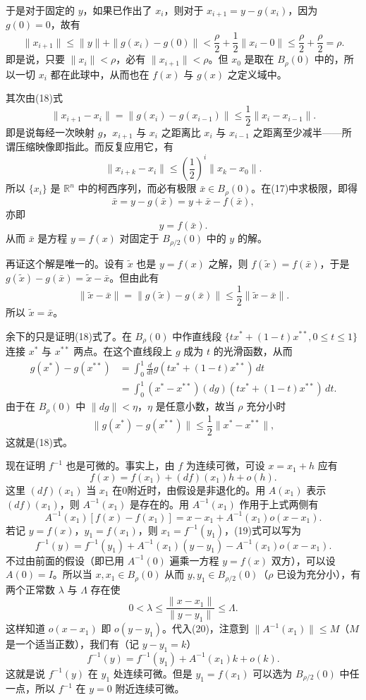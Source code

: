 于是对于固定的 $y$，如果已作出了 $x_i$，则对于 $x_{i+1}=y-g(x_i)$，因为 $g(0)=0$，故有
\[
 \|x_{i+1}\|\le\|y\|+\|g(x_i)-g(0)\|<\frac\rho2+\frac12\|x_i-0\|
 \le\frac\rho2+\frac\rho2=\rho.
\]
即是说，只要 $\|x_i\|<\rho$，必有 $\|x_{i+1}\|<\rho$。但 $x_0$ 是取在 $B_\rho(0)$ 中的，所以一切 $x_i$ 都在此球中，从而也在 $f(x)$ 与 $g(x)$ 之定义域中。

其次由(18)式
\[
 \|x_{i+1}-x_i\|=\|g(x_i)-g(x_{i-1})\|\le\frac12\|x_i-x_{i-1}\|.
\]
即是说每经一次映射 $g$，$x_{i+1}$ 与 $x_i$ 之距离比 $x_i$ 与 $x_{i-1}$ 之距离至少减半——所谓压缩映像即指此。而反复应用它，有
\[
 \|x_{i+k}-x_i\|\le\left(\frac12\right)^i\|x_k-x_0\|.
\]
所以 $\{x_i\}$ 是 $\mathbb R^n$ 中的柯西序列，而必有极限 $\bar x\in B_\rho(0)$。在(17)中求极限，即得
\[
 \bar x=y-g(\bar x)=y+\bar x-f(\bar x),
\]
亦即
\[
 y=f(\bar x).
\]
从而 $\bar x$ 是方程 $y=f(x)$ 对固定于 $B_{\rho/2}(0)$ 中的 $y$ 的解。

再证这个解是唯一的。设有 $\widetilde x$ 也是 $y=f(x)$ 之解，则 $f(\widetilde x)=f(\bar x)$，于是 $g(\widetilde x)-g(\bar x)=\widetilde x-\bar x$。但由此有
\[
 \|\widetilde x-\bar x\|=\|g(\widetilde x)-g(\bar x)\|\le\frac12\|\widetilde x-\bar x\|.
\]
所以 $\widetilde x=\bar x$。

余下的只是证明(18)式了。在 $B_\rho(0)$ 中作直线段 $\{tx^*+(1-t)x^{**},0\le t\le1\}$ 连接 $x^*$ 与 $x^{**}$ 两点。在这个直线段上 $g$ 成为 $t$ 的光滑函数，从而
\[
\begin{aligned}
 g(x^*)-g(x^{**})
 &=\int_0^1\frac d{dt}g(tx^*+(1-t)x^{**})\,dt\\
 &=\int_0^1(x^*-x^{**})(dg)(tx^*+(1-t)x^{**})\,dt.
\end{aligned}
\]
由于在 $B_\rho(0)$ 中 $\|dg\|<\eta$，$\eta$ 是任意小数，故当 $\rho$ 充分小时
\[
 \|g(x^*)-g(x^{**})\|\le\frac12\|x^*-x^{**}\|,
\]
这就是(18)式。

现在证明 $f^{-1}$ 也是可微的。事实上，由 $f$ 为连续可微，可设 $x=x_1+h$ 应有
\begin{equation}
 f(x)=f(x_1)+(df)(x_1)h+o(h).
 \tag{19}
\end{equation}
这里 $(df)(x_1)$ 当 $x_1$ 在0附近时，由假设是非退化的。用 $A(x_1)$ 表示 $(df)(x_1)$，则 $A^{-1}(x_1)$ 是存在的。用 $A^{-1}(x_1)$ 作用于上式两侧有
\[
 A^{-1}(x_1)[f(x)-f(x_1)]
 =x-x_1+A^{-1}(x_1)o(x-x_1).
\]
若记 $y=f(x)$，$y_1=f(x_1)$，则 $x_1=f^{-1}(y_1)$，(19)式可以写为
\begin{equation}
 f^{-1}(y)=f^{-1}(y_1)+A^{-1}(x_1)(y-y_1)-A^{-1}(x_1)o(x-x_1).
 \tag{20}
\end{equation}
不过由前面的假设（即已用 $A^{-1}(0)$ 遍乘一方程 $y=f(x)$ 双方），可以设 $A(0)=I$。所以当 $x,x_1\in B_\rho(0)$ 从而 $y,y_1\in B_{\rho/2}(0)$（$\rho$ 已设为充分小），有两个正常数 $\lambda$ 与 $\Lambda$ 存在使
\[
 0<\lambda\le\frac{\|x-x_1\|}{\|y-y_1\|}\le\Lambda.
\]
这样知道 $o(x-x_1)$ 即 $o(y-y_1)$。代入(20)，注意到 $\|A^{-1}(x_1)\|\le M$（$M$ 是一个适当正数），我们有（记 $y-y_1=k$）
\begin{equation}
 f^{-1}(y)=f^{-1}(y_1)+A^{-1}(x_1)k+o(k).
 \tag{21}
\end{equation}
这就是说 $f^{-1}(y)$ 在 $y_1$ 处连续可微。但是 $y_1=f(x_1)$ 可以选为 $B_{\rho/2}(0)$ 中任一点，所以 $f^{-1}$ 在 $y=0$ 附近连续可微。

